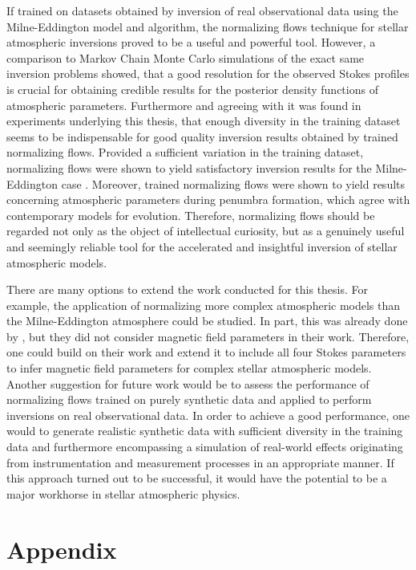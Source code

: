 \documentclass[a4paper,12pt]{report}
\def\lk#1{{\color{black}{#1}}}
\begin{document}
If trained on datasets obtained by inversion of real observational data using the Milne-Eddington model and algorithm, the normalizing flows technique for stellar atmospheric inversions proved to be a useful and powerful tool. However, a comparison to Markov Chain Monte Carlo simulations of the exact same inversion problems showed, that a good resolution for the observed Stokes profiles is crucial for obtaining credible results for the posterior density functions of atmospheric parameters. Furthermore and agreeing with \cite[p.12]{DiazBaso.2022} it was found in experiments underlying this thesis, that enough diversity in the training dataset seems to be indispensable for good quality inversion results obtained by trained normalizing flows. Provided a sufficient variation in the training dataset, normalizing flows were shown to yield satisfactory inversion results for the Milne-Eddington case \lk{including magnetic field properties}. Moreover, trained normalizing flows were shown to yield results concerning atmospheric parameters during penumbra formation, which agree with contemporary models for \lk{sunspot} evolution. Therefore, normalizing flows should be regarded not only as the object of intellectual curiosity, but as a genuinely useful and seemingly reliable tool for the accelerated and insightful inversion of stellar atmospheric models.

There are many options to extend the work conducted for this thesis. For example, the application of normalizing \lk{flows to invert} more complex atmospheric models than the Milne-Eddington atmosphere could be studied. In part, this was already done by \cite{DiazBaso.2022}, but they did not consider magnetic field parameters in their work. Therefore, one could build on their work and extend it to include all four Stokes parameters to infer magnetic field parameters for complex stellar atmospheric models. Another suggestion for future work would be to assess the performance of normalizing flows trained on purely synthetic data and applied to perform inversions on real observational data. In order to achieve a good performance, one would \lk{have} to generate realistic synthetic data with sufficient diversity in the training data and furthermore encompassing a simulation of real-world effects originating from instrumentation and measurement processes in an appropriate manner. If this approach turned out to be successful, it would have the potential to be a major workhorse in stellar atmospheric physics.

\FloatBarrier
\chapter{Appendix}
\end{document}
